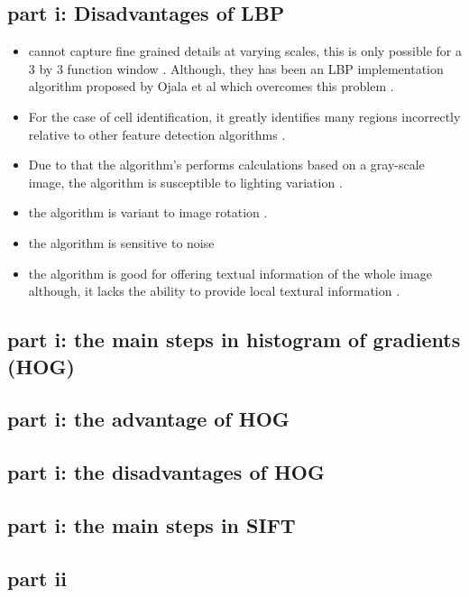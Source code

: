 \documentclass[conference]{IEEEtran}
\begin{document}
\subsection{part i: Disadvantages of LBP}
\begin{itemize}
	\item cannot capture fine grained details at varying scales, this is only possible for a 3 by 3 function window \cite{b5} \cite{b10}. Although, they has been an LBP implementation algorithm proposed by Ojala et al which overcomes this problem \cite{b5}.
	\item For the case of cell identification, it greatly identifies many regions incorrectly relative to other feature detection algorithms  \cite{b6}.
	\item Due to that the algorithm's performs calculations based on a gray-scale image, the algorithm is susceptible to lighting variation \cite{b9}.
	\item the algorithm is variant to image rotation \cite{b10}.
	\item the algorithm is sensitive to noise \cite{b10}
	\item the algorithm is good for offering textual information of the whole image although, it lacks the ability to provide local textural information \cite{b10}.
	
\end{itemize}

\subsection{part i: the main steps in histogram of gradients (HOG)}

\subsection{part i: the advantage of HOG}

\subsection{part i: the disadvantages of HOG}

\subsection{part i: the main steps in SIFT}
\subsection{part ii} \label{two ii}
\end{document}

